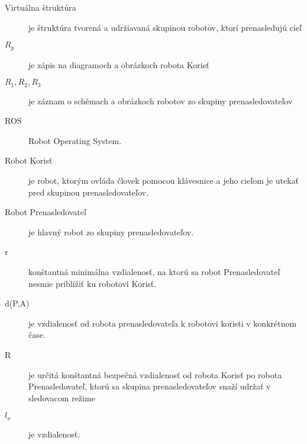 \documentclass[]{tukediphc}
\begin{document}
\begin{description}
	\item[Virtuálna štruktúra] je štruktúra tvorená a udržiavaná skupinou robotov, ktorí prenasledujú cieľ
	\item[\boldmath $R_p$] je zápis na diagramoch a obrázkoch robota Korisť
	\item[\boldmath $R_1, R_2, R_3$] je záznam o schémach a obrázkoch robotov zo skupiny prenasledovateľov
	\item[ROS] Robot Operating System.
	\item[Robot Korisť] je robot, ktorým ovláda človek pomocou klávesnice a jeho cieľom je utekať pred skupinou prenasledovateľov.	\item[Robot Prenasledovateľ] je hlavný robot zo skupiny prenasledovateľov.
	\item[r] konštantná minimálna vzdialenosť, na ktorú sa robot Prenasledovateľ nesmie priblížiť ku robotovi Korisť.
	\item[d(P,A)] je vzdialenosť od robota prenasledovateľa k robotovi koristi v konkrétnom čase.
	\item[R] je určitá konštantná bezpečná vzdialenosť od robota Korisť po robota Prenasledovateľ, ktorú sa skupina prenasledovateľov snaží udržať v sledovacom režime
	\item[\boldmath$l_x$] je vzdialenosť. 
\end{description}

\kslovnikterminov
%

%

%

%   

%

%

%
% 


% 
%
% 
% 
% 
% 
%
\newpage
{}
\protect\label{page:posledna}
\end{document}
